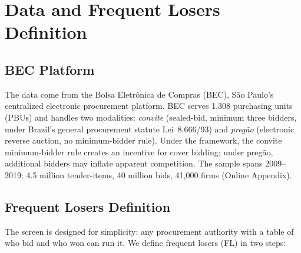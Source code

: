 

\section{Data and Frequent Losers Definition}
\label{sec:data}

\subsection{BEC Platform}
\label{sec:bec}

The data come from the Bolsa Eletr\^onica de Compras (BEC), S\~ao
Paulo's centralized electronic procurement platform. BEC serves 1,308
purchasing units (PBUs) and handles two modalities:
\emph{convite} (sealed-bid, minimum three bidders, under Brazil's
general procurement statute Lei~8.666/93) and
\emph{preg\~ao} (electronic reverse auction, no minimum-bidder rule).
Under the framework, the convite minimum-bidder rule creates an
incentive for cover bidding; under preg\~ao, additional bidders may
inflate apparent competition.
The sample spans 2009--2019: 4.5 million tender-items,
40 million bids, 41,000 firms
(Online Appendix).

\subsection{Frequent Losers Definition}
\label{sec:fl_definition}

The screen is designed for simplicity: any procurement authority
with a table of who bid and who won can run it. We define frequent
losers (FL) in two steps:

